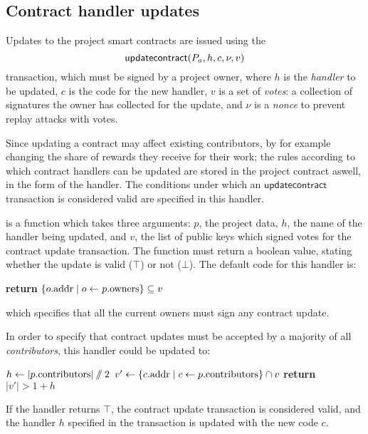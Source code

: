 \subsection{Contract handler updates}

Updates to the project smart contracts are issued using the
\[
    \mathsf{updatecontract}\lparen P_a, h, c, \nu, v\rparen
\]
transaction, which must be signed by a project owner, where $h$ is the
\emph{handler} to be updated, $c$ is the code for the new handler, $v$ is a set
of \emph{votes}: a collection of signatures the owner has collected for the
update, and $\nu$ is a \emph{nonce} to prevent replay attacks with votes.

Since updating a contract may affect existing contributors, by for example
changing the share of rewards they receive for their work; the rules according
to which contract handlers can be updated are stored in the project contract
aswell, in the form of the  handler.  The
conditions under which an $\mathsf{updatecontract}$ transaction is considered
valid are specified in this handler.

 is a function which takes three arguments: $p$,
the project data, $h$, the name of the handler being updated, and $v$, the list
of public keys which signed votes for the contract update transaction. The
function must return a boolean value, stating whether the update is valid ($\top$)
or not ($\bot$). The default code for this handler is:
\columnbreak
\begin{algorithmic}[0]
        \State \textbf{return} $\{ o.{\mathrm{addr}} \mid o \gets p.{\mathrm{owners}} \} \subseteq v$
    \EndProcedure
\end{algorithmic}
which specifies that all the current owners must sign any contract update.

In order to specify that contract updates must be accepted by a majority of all
\emph{contributors}, this handler could be updated to:
\medskip
\begin{algorithmic}[0]
        \State $h \gets |p.{\mathrm{contributors}}| \sslash 2$
        \State $v' \gets \{ c.{\mathrm{addr}} \mid c \gets p.{\mathrm{contributors}} \} \cap v$
        \State \textbf{return} $|v'| > 1 + h$
    \EndProcedure
\end{algorithmic}
If the handler returns $\top$, the contract update transaction is considered
valid, and the handler $h$ specified in the transaction is updated with the new code
$c$.

